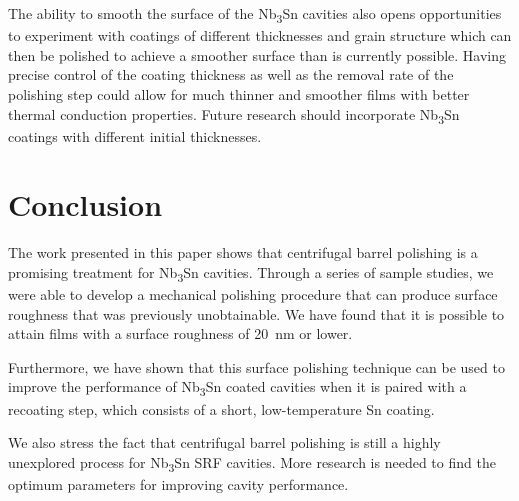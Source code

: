 The ability to smooth the surface of the Nb\textsubscript{3}Sn cavities also opens opportunities to experiment with coatings of different thicknesses and grain structure which can then be polished to achieve a smoother surface than is currently possible. Having precise control of the coating thickness as well as the removal rate of the polishing step could allow for much thinner and smoother films with better thermal conduction properties. Future research should incorporate Nb\textsubscript{3}Sn coatings with different initial thicknesses.

%
\section{Conclusion}%
\label{sec:Conclusion}%
The work presented in this paper shows that centrifugal barrel polishing is a promising treatment for Nb\textsubscript{3}Sn cavities. Through a series of sample studies, we were able to develop a mechanical polishing procedure that can produce surface roughness that was previously unobtainable. We have found that it is possible to attain films with a surface roughness of 20~nm or lower. 

Furthermore, we have shown that this surface polishing technique can be used to improve the performance of Nb\textsubscript{3}Sn coated cavities when it is paired with a recoating step, which consists of a short, low-temperature Sn coating.

We also stress the fact that centrifugal barrel polishing is still a highly unexplored process for Nb\textsubscript{3}Sn SRF cavities. More research is needed to find the optimum parameters for improving cavity performance.
